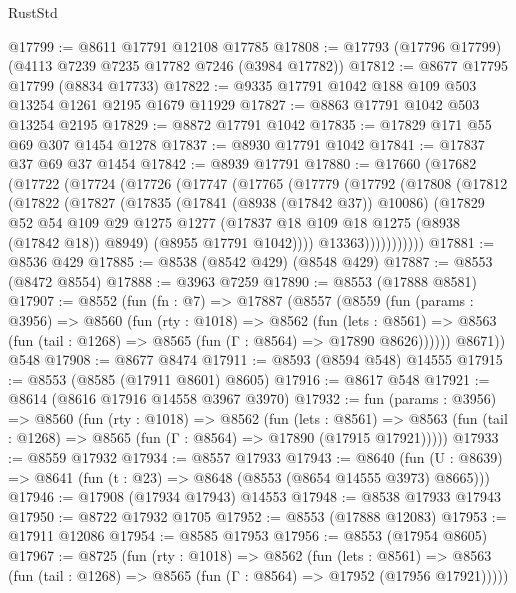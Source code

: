 \begin{lexlean}{RustStd}
\begin{coremodule}
@17799 := @8611 @17791 @12108 @17785
@17808 := @17793 (@17796 @17799) (@4113 @7239 @7235 @17782 @7246 (@3984 @17782))
@17812 := @8677 @17795 @17799 (@8834 @17733)
@17822 := @9335 @17791 @1042 @188 @109 @503 @13254 @1261 @2195 @1679 @11929
@17827 := @8863 @17791 @1042 @503 @13254 @2195
@17829 := @8872 @17791 @1042
@17835 := @17829 @171 @55 @69 @307 @1454 @1278
@17837 := @8930 @17791 @1042
@17841 := @17837 @37 @69 @37 @1454
@17842 := @8939 @17791
@17880 := @17660
    (@17682
      (@17722
        (@17724
          (@17726
            (@17747
              (@17765
                (@17779
                  (@17792
                    (@17808
                      (@17812
                        (@17822
                          (@17827
                            (@17835
                              (@17841 (@8938 (@17842 @37)) @10086)
                              (@17829
                                @52
                                @54
                                @109
                                @29
                                @1275
                                @1277
                                (@17837 @18 @109 @18 @1275 (@8938 (@17842 @18)) @8949)
                                (@8955 @17791 @1042))))
                          @13363)))))))))))
@17881 := @8536 @429
@17885 := @8538 (@8542 @429) (@8548 @429)
@17887 := @8553 (@8472 @8554)
@17888 := @3963 @7259
@17890 := @8553 (@17888 @8581)
@17907 := @8552
    (fun (fn : @7) =>
    @17887
      (@8557
        (@8559
          (fun (params : @3956) =>
          @8560
            (fun (rty : @1018) =>
            @8562
              (fun (lets : @8561) =>
              @8563 (fun (tail : @1268) => @8565 (fun (Γ : @8564) => @17890 @8626))))))
        @8671))
    @548
@17908 := @8677 @8474
@17911 := @8593 (@8594 @548) @14555
@17915 := @8553 (@8585 (@17911 @8601) @8605)
@17916 := @8617 @548
@17921 := @8614 (@8616 @17916 @14558 @3967 @3970)
@17932 := fun (params : @3956) =>
  @8560
    (fun (rty : @1018) =>
    @8562
      (fun (lets : @8561) =>
      @8563 (fun (tail : @1268) => @8565 (fun (Γ : @8564) => @17890 (@17915 @17921)))))
@17933 := @8559 @17932
@17934 := @8557 @17933
@17943 := @8640
    (fun (U : @8639) => @8641 (fun (t : @23) => @8648 (@8553 (@8654 @14555 @3973) @8665)))
@17946 := @17908 (@17934 @17943) @14553
@17948 := @8538 @17933 @17943
@17950 := @8722 @17932 @1705
@17952 := @8553 (@17888 @12083)
@17953 := @17911 @12086
@17954 := @8585 @17953
@17956 := @8553 (@17954 @8605)
@17967 := @8725
    (fun (rty : @1018) =>
    @8562
      (fun (lets : @8561) =>
      @8563 (fun (tail : @1268) => @8565 (fun (Γ : @8564) => @17952 (@17956 @17921)))))

\end{coremodule}
\end{lexlean}
